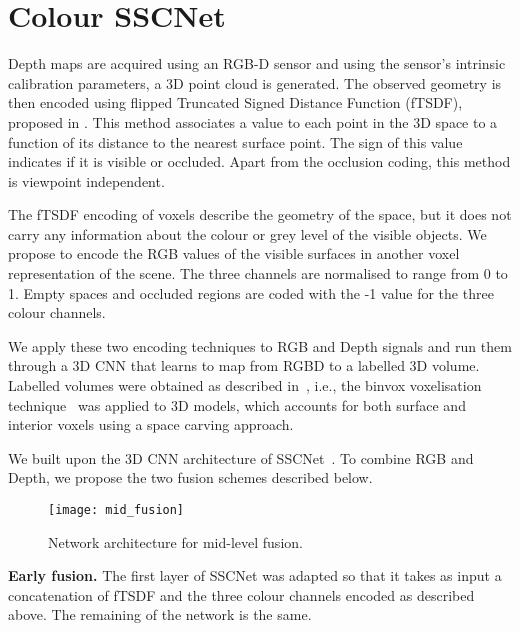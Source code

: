 \section{Colour SSCNet}
\label{sec:colour_sscnet}

Depth maps are acquired using an RGB-D sensor and using
the sensor's intrinsic calibration parameters,
a 3D point cloud is generated. The observed geometry
is then encoded using flipped Truncated Signed Distance
Function (fTSDF), proposed
in  \cite{song_etal_SSCnet_cvpr2017}. This method
associates a value to each point in the 3D space to a
function of its distance to the nearest surface point.
The sign of this value indicates if it is visible or occluded.
Apart from the occlusion coding, this method is viewpoint
independent.

The fTSDF encoding of voxels describe the geometry of the
space, but it does not carry any information about the
colour or grey level of the visible objects.
We propose to encode the RGB values of the visible surfaces
in another voxel representation of the scene.
The three channels are normalised to range from 0 to 1.
Empty spaces and occluded regions are coded with the -1
value for the three colour channels.

We apply these two encoding techniques to
RGB and Depth signals and run them through a 3D CNN
that learns to map from RGBD to a labelled 3D volume.
Labelled volumes were obtained as described
in~\cite{song_etal_SSCnet_cvpr2017}, i.e.,
the binvox voxelisation technique~\cite{nooruddin_turk_BinVox_tvcg2003}
was applied to 3D models, which accounts for both
surface and interior voxels using a space carving approach.

We built upon the 3D CNN architecture of
SSCNet~\cite{song_etal_SSCnet_cvpr2017}.
To combine RGB and Depth, we propose the two fusion
schemes described below.

\begin{figure}
  \centerline{
\texttt{[image: mid\_fusion]}
  }
  \caption{\label{fig:network_architecture}Network architecture for
    mid-level fusion.}
\end{figure}


{\bf Early fusion.}
The first layer of SSCNet was adapted so that it takes as input
a concatenation of fTSDF and the three colour channels
encoded as described above.
The remaining of the network is the same.

